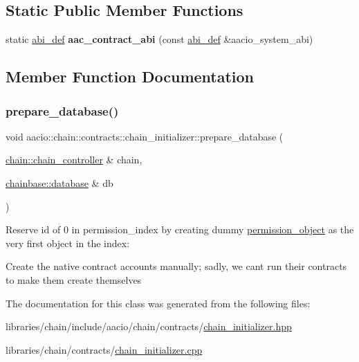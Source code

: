 \subsection*{Static Public Member Functions}
\begin{DoxyCompactItemize}
\item 
\mbox{\label{classaacio_1_1chain_1_1contracts_1_1chain__initializer_a4d0b3b09f02dd65a11ddf8c0e1197f1c}} 
static \mbox{\hyperlink{structaacio_1_1chain_1_1contracts_1_1abi__def}{abi\+\_\+def}} {\bfseries aac\+\_\+contract\+\_\+abi} (const \mbox{\hyperlink{structaacio_1_1chain_1_1contracts_1_1abi__def}{abi\+\_\+def}} \&aacio\+\_\+system\+\_\+abi)
\end{DoxyCompactItemize}


\subsection{Member Function Documentation}
\mbox{\label{classaacio_1_1chain_1_1contracts_1_1chain__initializer_a6986df6ae1b4a8954bd31e4d84527d65}} 
\subsubsection{\texorpdfstring{prepare\+\_\+database()}{prepare\_database()}}
{\footnotesize\ttfamily void aacio\+::chain\+::contracts\+::chain\+\_\+initializer\+::prepare\+\_\+database (\begin{DoxyParamCaption}\item[{\mbox{\hyperlink{classaacio_1_1chain_1_1chain__controller}{chain\+::chain\+\_\+controller}} \&}]{chain,  }\item[{\mbox{\hyperlink{classchainbase_1_1database}{chainbase\+::database}} \&}]{db }\end{DoxyParamCaption})}

Reserve id of 0 in permission\+\_\+index by creating dummy \mbox{\hyperlink{classaacio_1_1chain_1_1permission__object}{permission\+\_\+object}} as the very first object in the index\+:

Create the native contract accounts manually; sadly, we can\textquotesingle{}t run their contracts to make them create themselves 

The documentation for this class was generated from the following files\+:\begin{DoxyCompactItemize}
\item 
libraries/chain/include/aacio/chain/contracts/\mbox{\hyperlink{chain__initializer_8hpp}{chain\+\_\+initializer.\+hpp}}\item 
libraries/chain/contracts/\mbox{\hyperlink{chain__initializer_8cpp}{chain\+\_\+initializer.\+cpp}}\end{DoxyCompactItemize}
